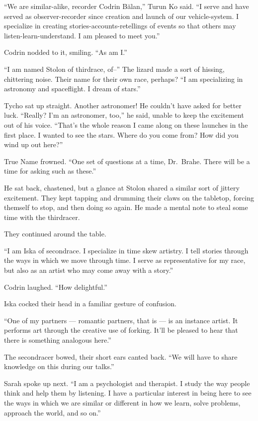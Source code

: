 ``We are similar-alike, recorder Codrin Bălan,'' Turun Ko said. ``I serve and have served as observer-recorder since creation and launch of our vehicle-system. I specialize in creating stories-accounts-retellings of events so that others may listen-learn-understand. I am pleased to meet you.''

Codrin nodded to it, smiling. ``As am I.''

``I am named Stolon of thirdrace, of--'' The lizard made a sort of hissing, chittering noise. Their name for their own race, perhaps? ``I am specializing in astronomy and spaceflight. I dream of stars.''

Tycho sat up straight. Another astronomer! He couldn't have asked for better luck. ``Really? I'm an astronomer, too,'' he said, unable to keep the excitement out of his voice. ``That's the whole reason I came along on these launches in the first place. I wanted to see the stars. Where do you come from? How did you wind up out here?''

True Name frowned. ``One set of questions at a time, Dr.~Brahe. There will be a time for asking such as these.''

He sat back, chastened, but a glance at Stolon shared a similar sort of jittery excitement. They kept tapping and drumming their claws on the tabletop, forcing themself to stop, and then doing so again. He made a mental note to steal some time with the thirdracer.

They continued around the table.

``I am Iska of secondrace. I specialize in time skew artistry. I tell stories through the ways in which we move through time. I serve as representative for my race, but also as an artist who may come away with a story.''

Codrin laughed. ``How delightful.''

Iska cocked their head in a familiar gesture of confusion.

``One of my partners — romantic partners, that is — is an instance artist. It performs art through the creative use of forking. It'll be pleased to hear that there is something analogous here.''

The secondracer bowed, their short ears canted back. ``We will have to share knowledge on this during our talks.''

Sarah spoke up next. ``I am a psychologist and therapist. I study the way people think and help them by listening. I have a particular interest in being here to see the ways in which we are similar or different in how we learn, solve problems, approach the world, and so on.''

